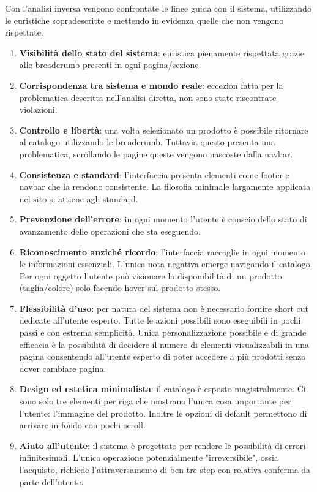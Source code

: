 \documentclass[12pt,italian,]{report}
\providecommand{\tightlist}{%
  \setlength{\itemsep}{0pt}\setlength{\parskip}{0pt}}
\begin{document}
Con l'analisi inversa vengono confrontate le linee guida con il sistema, utilizzando le euristiche sopradescritte e mettendo in evidenza quelle che non vengono rispettate.
\begin{enumerate}
\def\labelenumi{\arabic{enumi}.}
\tightlist
\item
  \textbf{Visibilità dello stato del sistema}: euristica pienamente rispettata grazie alle breadcrumb presenti in ogni pagina/sezione.
\item
  \textbf{Corrispondenza tra sistema e mondo reale}: eccezion fatta per la problematica descritta nell'analisi diretta, non sono state riscontrate violazioni.
\item
  \textbf{Controllo e libertà}: una volta selezionato un prodotto è possibile ritornare al catalogo utilizzando le breadcrumb. Tuttavia questo presenta una problematica, scrollando le pagine queste vengono nascoste dalla navbar.
\item
  \textbf{Consistenza e standard}: l'interfaccia presenta elementi come footer e navbar che la rendono consistente. La filosofia minimale largamente applicata nel sito si attiene agli standard.
\item
  \textbf{Prevenzione dell'errore}: in ogni momento l'utente è conscio dello stato di avanzamento delle operazioni che sta eseguendo. 
\item
  \textbf{Riconoscimento anziché ricordo}: l'interfaccia raccoglie in ogni momento le informazioni essenziali. L'unica nota negativa emerge navigando il catalogo. Per ogni oggetto l'utente può visionare la disponibilità di un prodotto (taglia/colore) solo facendo hover sul prodotto stesso.
\item
  \textbf{Flessibilità d'uso}: per natura del sistema non è necessario fornire short cut dedicate all'utente esperto. Tutte le azioni possibili sono eseguibili in pochi passi e con estrema semplicità. Unica personalizzazione possibile e di grande efficacia è la possibilità di decidere il numero di elementi visualizzabili in una pagina consentendo all'utente esperto di poter accedere a più prodotti senza dover cambiare pagina.
\item
  \textbf{Design ed estetica minimalista}: il catalogo è esposto magistralmente. Ci sono solo tre elementi per riga che mostrano l'unica cosa importante per l'utente: l'immagine del prodotto. Inoltre le opzioni di default permettono di arrivare in fondo con pochi scroll. 
\item
  \textbf{Aiuto all'utente}: il sistema è progettato per rendere le possibilità di errori infinitesimali. L'unica operazione potenzialmente "irreversibile", ossia l'acquisto, richiede l'attraversamento di ben tre step con relativa conferma da parte dell'utente. 

\end{enumerate}
\end{document}
